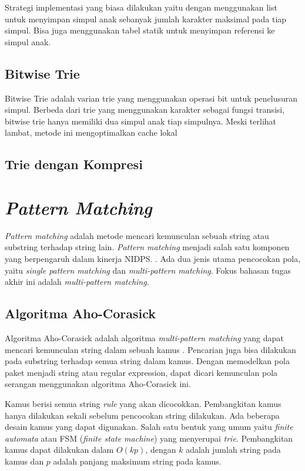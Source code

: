   Strategi implementasi yang biasa dilakukan yaitu dengan menggunakan list untuk menyimpan simpul anak sebanyak jumlah karakter maksimal pada tiap simpul. Bisa juga menggunakan tabel statik untuk menyimpan referensi ke simpul anak. 

  \subsection{Bitwise Trie}

    Bitwise Trie adalah varian trie yang menggunakan operasi bit untuk penelusuran simpul. Berbeda dari trie yang menggunakan karakter sebagai fungsi transisi, bitwise trie hanya memiliki dua simpul anak tiap simpulnya. Meski terlihat lambat, metode ini mengoptimalkan cache lokal

  \subsection{Trie dengan Kompresi}

\section{\emph{Pattern Matching}}

  \emph{Pattern matching} adalah metode mencari kemunculan sebuah string atau substring terhadap string lain. \emph{Pattern matching} menjadi salah satu komponen yang berpengaruh dalam kinerja NIDPS. . Ada dua jenis utama pencocokan pola, yaitu \emph{single pattern matching} dan \emph{multi-pattern matching}. Fokus bahasan tugas akhir ini adalah \emph{multi-pattern matching}.

  \subsection{Algoritma Aho-Corasick}

    Algoritma Aho-Corasick adalah algoritma \emph{multi-pattern matching} yang dapat mencari kemunculan string dalam sebuah kamus \citep{ahoc1975}. Pencarian juga bisa dilakukan pada substring terhadap semua string dalam kamus. Dengan memodelkan pola paket menjadi string atau regular expression, dapat dicari kemunculan pola serangan menggunakan algoritma Aho-Corasick ini.

    Kamus berisi semua string \emph{rule} yang akan dicocokkan. Pembangkitan kamus hanya dilakukan sekali sebelum pencocokan string dilakukan. Ada beberapa desain kamus yang dapat digunakan. Salah satu bentuk yang umum yaitu \emph{finite automata} atau FSM (\emph{finite state machine}) yang menyerupai \emph{trie}. Pembangkitan kamus dapat dilakukan dalam $O(kp)$, dengan $k$ adalah jumlah string pada kamus dan $p$ adalah panjang maksimum string pada kamus.

